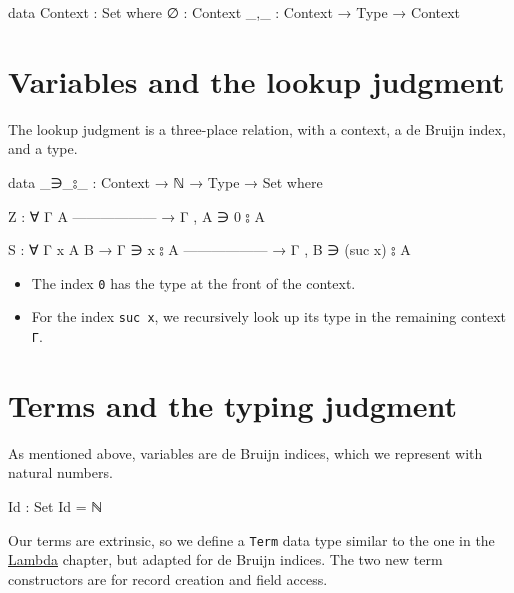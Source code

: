 \begin{fence}
\begin{code}
data Context : Set where
  ∅   : Context
  _,_ : Context → Type → Context
\end{code}
\end{fence}

\hypertarget{variables-and-the-lookup-judgment}{%
\section{Variables and the lookup
judgment}\label{variables-and-the-lookup-judgment}}

The lookup judgment is a three-place relation, with a context, a de
Bruijn index, and a type.

\begin{fence}
\begin{code}
data _∋_⦂_ : Context → ℕ → Type → Set where

  Z : ∀ {Γ A}
      ------------------
    → Γ , A ∋ 0 ⦂ A

  S : ∀ {Γ x A B}
    → Γ ∋ x ⦂ A
      ------------------
    → Γ , B ∋ (suc x) ⦂ A
\end{code}
\end{fence}

\begin{itemize}
\item
  The index \texttt{0} has the type at the front of the context.
\item
  For the index \texttt{suc\ x}, we recursively look up its type in the
  remaining context \texttt{Γ}.
\end{itemize}

\hypertarget{terms-and-the-typing-judgment}{%
\section{Terms and the typing
judgment}\label{terms-and-the-typing-judgment}}

As mentioned above, variables are de Bruijn indices, which we represent
with natural numbers.

\begin{fence}
\begin{code}
Id : Set
Id = ℕ
\end{code}
\end{fence}

Our terms are extrinsic, so we define a \texttt{Term} data type similar
to the one in the \protect\hyperlink{Lambda}{Lambda} chapter, but
adapted for de Bruijn indices. The two new term constructors are for
record creation and field access.

